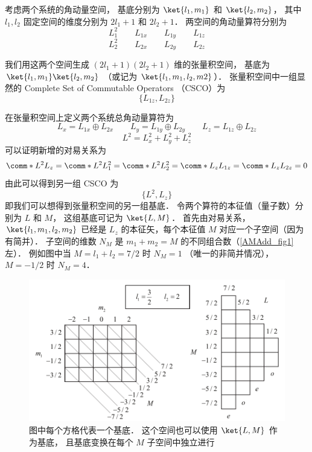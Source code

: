 

考虑两个系统的角动量空间， 基底分别为 $\ket{l_1, m_1}$ 和 $\ket{l_2, m_2}$， 其中 $l_1, l_2$ 固定空间的维度分别为 $2l_1+1$ 和 $2l_2+1$． 两空间的角动量算符分别为
\begin{equation}
L_1^2 \qquad L_{1x} \qquad L_{1y} \qquad L_{1z}
\end{equation}
\begin{equation}
L_2^2 \qquad L_{2x} \qquad L_{2y} \qquad L_{2z}
\end{equation}

我们用这两个空间生成 $(2l_1+1)(2l_2+1)$ 维的张量积空间， 基底为 $\ket{l_1, m_1} \ket{l_2, m_2}$ （或记为 $\ket{l_1, m_1, l_2, m2}$）． 张量积空间中一组显然的 Complete Set of Commutable Operators （CSCO）为
\begin{equation}
\{L_{1z}, L_{2z}\}
\end{equation}

在张量积空间上定义两个系统总角动量算符为
\begin{equation}
L_x = L_{1x} \oplus L_{2x}
\qquad
L_y = L_{1y} \oplus L_{2y}
\qquad
L_z = L_{1z} \oplus L_{2z}
\end{equation}
\begin{equation}
L^2 = L_x^2 + L_y^2 + L_z^2
\end{equation}
可以证明新增的对易关系为
\begin{equation}
\comm*{L^2}{L_z} = \comm*{L^2}{L_1^2} = \comm*{L^2}{L_2^2} = 
\comm*{L_z}{L_{1z}} = \comm*{L_z}{L_{2z}} = 0
\end{equation}
由此可以得到另一组 CSCO 为 %
\begin{equation}
\{L^2, L_z\}
\end{equation}
即我们可以想得到张量积空间的另一组基底． 令两个算符的本征值（量子数）分别为 $L$  和 $M$， 这组基底可记为 $\ket{L, M}$．  首先由对易关系， $\ket{l_1, m_1, l_2, m_2}$ 已经是 $L_z$ 的本征矢，每个本征值 $M$ 对应一个子空间（因为有简并）． 子空间的维数 $N_M$ 是 $m_1 + m_2 = M$ 的不同组合数（\autoref{AMAdd_fig1} 左）． 例如图中当 $M = l_1 + l_2 = 7/2$ 时 $N_M = 1$ （唯一的非简并情况）， $M = -1/2$ 时 $N_M = 4$．
\begin{figure}[ht]
\centering
\includegraphics[width=14cm]{./figures/AMAdd1.pdf}
\caption{图中每个方格代表一个基底． 这个空间也可以使用 $\ket{L, M}$ 作为基底， 且基底变换在每个 $M$ 子空间中独立进行} \label{AMAdd_fig1}
\end{figure}

